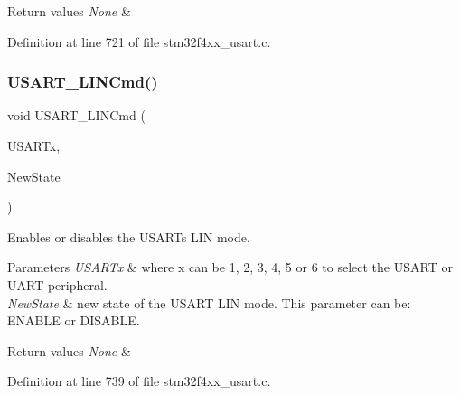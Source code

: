 \begin{DoxyRetVals}{Return values}
{\em None} & \\
\hline
\end{DoxyRetVals}


Definition at line 721 of file stm32f4xx\+\_\+usart.\+c.

\mbox{\label{group___u_s_a_r_t_ga9fdd6296f4ca4acdfcbd58bf56bd4185}} 
\subsubsection{\texorpdfstring{U\+S\+A\+R\+T\+\_\+\+L\+I\+N\+Cmd()}{USART\_LINCmd()}}
{\footnotesize\ttfamily void U\+S\+A\+R\+T\+\_\+\+L\+I\+N\+Cmd (\begin{DoxyParamCaption}\item[{\hyperlink{struct_u_s_a_r_t___type_def}{U\+S\+A\+R\+T\+\_\+\+Type\+Def} $\ast$}]{U\+S\+A\+R\+Tx,  }\item[{Functional\+State}]{New\+State }\end{DoxyParamCaption})}



Enables or disables the U\+S\+A\+RT\textquotesingle{}s L\+IN mode. 


\begin{DoxyParams}{Parameters}
{\em U\+S\+A\+R\+Tx} & where x can be 1, 2, 3, 4, 5 or 6 to select the U\+S\+A\+RT or U\+A\+RT peripheral. \\
\hline
{\em New\+State} & new state of the U\+S\+A\+RT L\+IN mode. This parameter can be\+: E\+N\+A\+B\+LE or D\+I\+S\+A\+B\+LE. \\
\hline
\end{DoxyParams}

\begin{DoxyRetVals}{Return values}
{\em None} & \\
\hline
\end{DoxyRetVals}


Definition at line 739 of file stm32f4xx\+\_\+usart.\+c.

\mbox{\label{group___u_s_a_r_t_ga3ed89ea8765d851510cfe90f7d90cbbb}} 
